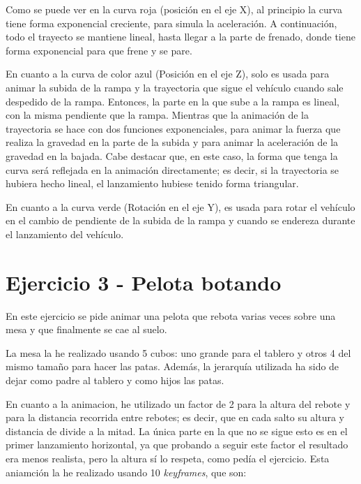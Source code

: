 \documentclass{article}
\begin{document}
Como se puede ver en la curva roja (posición en el eje X), al principio la curva tiene forma exponencial creciente, para simula la aceleración. A continuación, todo el trayecto se mantiene lineal, hasta llegar a la parte de frenado, donde tiene forma exponencial para que frene y se pare.

En cuanto a la curva de color azul (Posición en el eje Z), solo es usada para animar la subida de la rampa y la trayectoria que sigue el vehículo cuando sale despedido de la rampa. Entonces, la parte en la que sube a la rampa es lineal, con la misma pendiente que la rampa. Mientras que la animación de la trayectoria se hace con dos funciones exponenciales, para animar la fuerza que realiza la gravedad en la parte de la subida y para animar la aceleración de la gravedad en la bajada. Cabe destacar que, en este caso, la forma que tenga la curva será reflejada en la animación directamente; es decir, si la trayectoria se hubiera hecho lineal, el lanzamiento hubiese tenido forma triangular.

En cuanto a la curva verde (Rotación en el eje Y), es usada para rotar el vehículo en el cambio de pendiente de la subida de la rampa y cuando se endereza durante el lanzamiento del vehículo.

\section{Ejercicio 3 - Pelota botando}

En este ejercicio se pide animar una pelota que rebota varias veces sobre una mesa y que finalmente se cae al suelo. 

La mesa la he realizado usando 5 cubos: uno grande para el tablero y otros 4 del mismo tamaño para hacer las patas. Además, la jerarquía utilizada ha sido de dejar como padre al tablero y como hijos las patas.

En cuanto a la animacion, he utilizado un factor de 2 para la altura del rebote y para la distancia recorrida entre rebotes; es decir, que en cada salto su altura y distancia de divide a la mitad. La única parte en la que no se sigue esto es en el primer lanzamiento horizontal, ya que probando a seguir este factor el resultado era menos realista, pero la altura sí lo respeta, como pedía el ejercicio. Esta aniamción la he realizado usando 10 \textit{keyframes}, que son:
\end{document}

